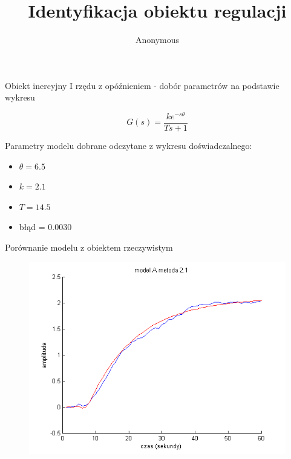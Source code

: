 \documentclass{beamer}
\title[\insertframenumber/\inserttotalframenumber]{Identyfikacja obiektu regulacji}
\author{Anonymous}
\institute{Akademia Górniczo-Hutnicza \\ Kraków}
\begin{document}
\begin{frame}
  \titlepage
\end{frame}



\begin{frame}{Obiekt inercyjny I rzędu z opóźnieniem - dobór parametrów na podstawie wykresu }

\begin{equation*}
G(s) = \frac{k e^{-s \theta}}{T s + 1}
\end{equation*}

Parametry modelu dobrane odczytane z wykresu doświadczalnego:

\begin{itemize}
\item $\theta = 6.5$
\item $k = 2.1$
\item $T = 14.5$
\item błąd = 0.0030
\end{itemize}

\end{frame}


\begin{frame}{Porównanie modelu z obiektem rzeczywistym}

\begin{figure}
\includegraphics[width = \linewidth]{A_2_1}
\end{figure}

\end{frame}
\end{document}
